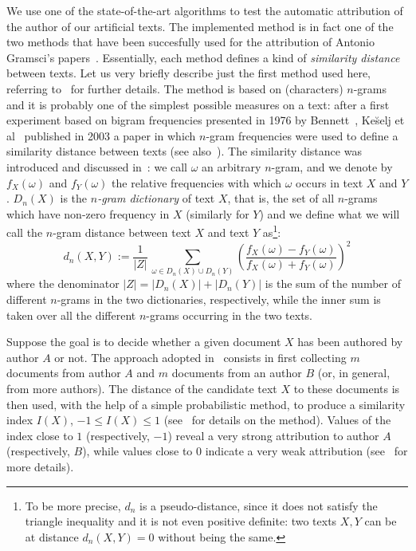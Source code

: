 \documentclass[journal]{IEEEtran}
\begin{document}
We use one of the state-of-the-art algorithms to test the automatic attribution of the author of our artificial texts. The implemented method is in fact one of the two methods that have been succesfully used for the attribution of Antonio Gramsci's papers~\cite{Basile2008}.
%
Essentially, each method defines a kind of \textit{similarity distance} between texts.
%
Let us very briefly describe just the first method used here, referring to~\cite{Benedetto2013} for further details.
%
The method is based on (characters) $n$-grams and it is probably one of the simplest possible measures on a text: after a first experiment based on bigram frequencies presented in 1976 by Bennett~\cite{Bennett1976}, Ke\u{s}elj et al~\cite{Kes03} published in 2003 a paper in which $n$-gram frequencies were used to
define a similarity distance between texts (see also~\cite{Clement2003}).
%
The similarity distance was introduced and discussed in~\cite{Basile2008}: we call $\omega$ an arbitrary $n$-gram, and we denote by $f_{X}(\omega)$ and $f_{Y}(\omega)$ the relative frequencies with which $\omega$ occurs in text $X$ and $Y$. $D_{n}(X)$ is the \textit{$n$-gram dictionary} of text $X$, that is, the set of all $n$-grams which have non-zero frequency in $X$ (similarly for $Y$) and we define what we will call the $n$-gram distance between text $X$ and text $Y$ as\footnote{To be more precise, $d_{n}$ is a pseudo-distance, since it does not satisfy the triangle inequality and it is not even positive definite: two texts $X,Y$ can be at distance $d_{n}(X,Y)=0$ without being the same.}:
\begin{equation}
d_{n}(X,Y):=\frac{1}{|Z|}\,\sum_{\omega\in D_{n}(X)\cup D_{n}(Y)}\left(\frac{f_{X}(\omega)-f_{Y}(\omega)}{f_{X}(\omega)+f_{Y}(\omega)}\right)^{2}\label{ngramdis}
\end{equation}
where the denominator $|Z| = \left\vert D_{n}(X)\right\vert + \left\vert D_{n}(Y)\right\vert$ is the sum of the number of different $n$-grams in the two dictionaries, respectively, while the inner sum is taken over all the different $n$-grams occurring in the two texts.

Suppose the goal is to decide whether a given document $X$ has been authored by author $A$ or not. The approach adopted in~\cite{Basile2008} consists in first collecting $m$ documents from author $A$ and $m$ documents from an author $B$ (or, in general, from more authors). The distance of the candidate text $X$ to these documents is then used, with the help of a simple probabilistic method, to produce a similarity index $I(X)$, $-1\leq I(X)\leq 1$ (see~\cite{Basile2008} for details on the method). Values of the index close to $1$ (respectively, $-1$) reveal a very strong attribution to author $A$ (respectively, $B$), while values close to 0 indicate a very weak attribution (see~\cite{Basile2008,Benedetto2013} for more details).
\end{document}
